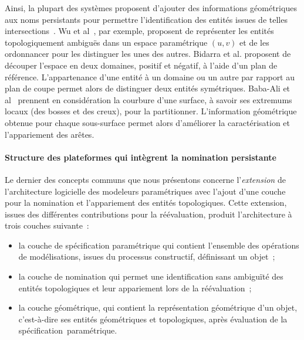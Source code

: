 Ainsi, la plupart des systèmes proposent d'ajouter des informations géométriques
aux noms persistants pour permettre l'identification des entités issues de
telles intersections~\cite{wu2001face,bidarra2005feature,wang2005geometry}. %
Wu et al~\cite{wu2001face}, par exemple, proposent de représenter les entités
topologiquement ambiguës dans un espace paramétrique $(u,v)$ et de les ordonnancer
pour les distinguer les unes des autres. Bidarra et al.\cite{bidarra2005feature} proposent de découper l'espace en deux domaines, positif et négatif, à l'aide d'un plan de référence.
L'appartenance d'une entité à un domaine ou un autre par rapport au plan de
coupe permet alors de distinguer deux entités symétriques. Baba-Ali et al~\cite{baba2009method}
prennent en considération la courbure d'une surface, à savoir ses extremums
locaux (des bosses et des creux), pour la partitionner. %
L'information géométrique obtenue pour chaque sous-surface permet alors
d'améliorer la caractérisation et l'appariement des arêtes. %


\paragraph*{Structure des plateformes qui intègrent la nomination persistante}


Le dernier des concepts communs que nous présentons concerne l'\textit{extension} de
l'architecture logicielle des modeleurs paramétriques avec l'ajout d'une couche
pour la nomination et l'appariement des entités topologiques. %
Cette extension, issues des différentes contributions pour la réévaluation,
produit l'architecture à trois couches suivante~:
\begin{itemize}
	\item la couche de spécification paramétrique qui contient l'ensemble des
	      opérations de modélisations, issues du processus constructif,
	      définissant un objet~; %
	\item la couche de nomination qui permet une identification sans ambiguïté des
	      entités topologiques et leur appariement lors de la réévaluation~; %
	\item la couche géométrique, qui contient la représentation géométrique d'un objet, c'est-à-dire ses entités géométriques et topologiques, après évaluation de la spécification~paramétrique. %
\end{itemize}


